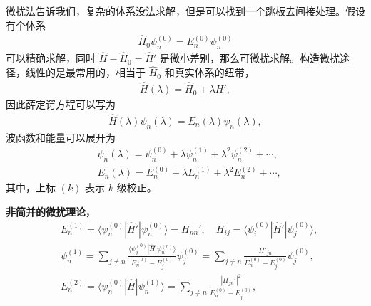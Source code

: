 微扰法告诉我们，复杂的体系没法求解，但是可以找到一个跳板去间接处理。假设有个体系
\begin{align}
    \hat H_0 \psi_n^{(0)} = E_n^{(0)} \psi_n^{(0)}
\end{align}
可以精确求解，同时 $\hat H - \hat H_0 = \hat H'$ 是微小差别，那么可微扰求解。构造微扰途径，线性的是最常用的，相当于 $\hat H_0$ 和真实体系的纽带，
\begin{align}
    \hat H(\lambda) = \hat H_0 + \lambda H',
\end{align}
因此薛定谔方程可以写为
\begin{align}
    \hat H(\lambda) \psi_n(\lambda) = E_n(\lambda) \psi_n(\lambda), 
\end{align}
波函数和能量可以展开为
\begin{align}
    &\psi_n(\lambda) = \psi_n^{(0)} + \lambda \psi_n^{(1)} + \lambda^2 \psi_n^{(2)} + \cdots, \\
    &E_n(\lambda) = E_n^{(0)} + \lambda E_n^{(1)} + \lambda^2 E_n^{(2)} + \cdots, 
\end{align}
其中，上标 $(k)$ 表示 $k$ 级校正。

\textbf{非简并的微扰理论}，
\begin{align}
    &E_n^{(1)} = \langle \psi_n^{(0)} | \hat H' | \psi_n^{(0)} \rangle = H_{nn}', \quad H_{ij} = \langle \psi_i^{(0)} | \hat H' | \psi_j^{(0)} \rangle, \\
    &\psi_n^{(1)} = \sum_{j\neq n} \frac{\langle \psi_j^{(0)} | \hat H | \psi_n^{(0)} \rangle} {E_n^{(0)} - E_j^{(0)}} \psi_j^{(0)} = \sum_{j\neq n} \frac{H'_{jn}}{E_n^{(0)} - E_j^{(0)}} \psi_j^{(0)},\\
    &E_n^{(2)} = \langle \psi_n^{(0)} | \hat H | \psi_n^{(1)} \rangle = 
    \sum_{j\neq n} \frac{|H_{jn}'|^2}{E_n^{(0)} - E_j^{(0)}}, 
\end{align}

